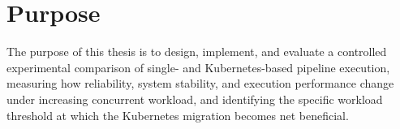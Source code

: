 \section{Purpose}

The purpose of this thesis is to design, implement, and evaluate a controlled experimental
comparison of single-\vm{} and Kubernetes-based \dagster{} pipeline execution, measuring
how reliability, system stability, and execution performance change under increasing
concurrent workload, and identifying the specific workload threshold at which the Kubernetes
migration becomes net beneficial.
